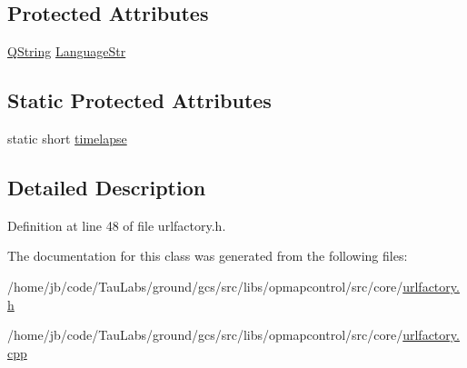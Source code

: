 \subsection*{\-Protected \-Attributes}
\begin{DoxyCompactItemize}
\item 
\hyperlink{group___u_a_v_objects_plugin_gab9d252f49c333c94a72f97ce3105a32d}{\-Q\-String} \hyperlink{group___o_p_map_widget_ga5d9399e074794da8ad0593e87e554228}{\-Language\-Str}
\end{DoxyCompactItemize}
\subsection*{\-Static \-Protected \-Attributes}
\begin{DoxyCompactItemize}
\item 
static short \hyperlink{group___o_p_map_widget_ga5dba09925e03ae10c70290f9a2e9cc61}{timelapse}
\end{DoxyCompactItemize}


\subsection{\-Detailed \-Description}


\-Definition at line 48 of file urlfactory.\-h.



\-The documentation for this class was generated from the following files\-:\begin{DoxyCompactItemize}
\item 
/home/jb/code/\-Tau\-Labs/ground/gcs/src/libs/opmapcontrol/src/core/\hyperlink{urlfactory_8h}{urlfactory.\-h}\item 
/home/jb/code/\-Tau\-Labs/ground/gcs/src/libs/opmapcontrol/src/core/\hyperlink{urlfactory_8cpp}{urlfactory.\-cpp}\end{DoxyCompactItemize}

